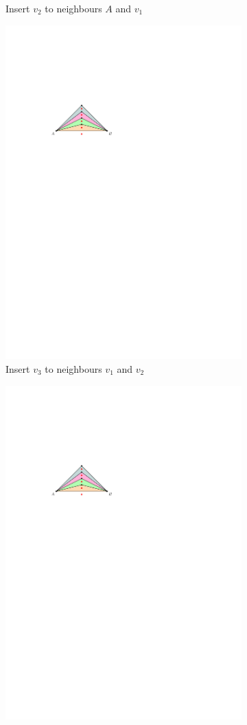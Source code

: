 \begin{figure}[H]
\begin{subfigure}{0.4\textwidth}
	\caption{Insert $v_2$ to neighbours $A$ and $v_1$}
\end{subfigure}
\begin{subfigure}{0.4\textwidth}
	\centering
	\includegraphics[width=.7\linewidth,page=5]{drawings/k-trees.pdf}
	\caption{Insert $v_3$ to neighbours $v_1$ and $v_2$}
\end{subfigure}
\begin{subfigure}{0.4\textwidth}
\centering
\includegraphics[width=.7\linewidth,page=6]{drawings/k-trees.pdf}

\end{subfigure}
\end{figure}
